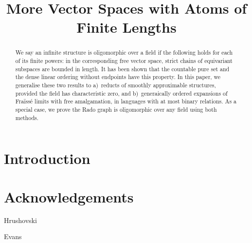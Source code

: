 \documentclass[conference]{IEEEtran}
\theoremstyle{definition}
\theoremstyle{remark}
\begin{document}
\title{More Vector Spaces with Atoms of Finite Lengths
}

\author{

\and

\and
}

\maketitle

\begin{abstract}
    We say an infinite structure is oligomorphic over a field 
    if the following holds for each of its finite powers:
    in the corresponding free vector space, strict chains of equivariant subspaces are bounded in length.
    It has been  shown that the countable pure set and the dense linear ordering without endpoints have this property.
    In this paper, we generalise these two results to
    a)~reducts of smoothly approximable structures, provided the field has characteristic zero, and
    b)~generaically ordered expansions of Fraïssé limits with free amalgamation, in languages with at most binary relations.
    As a special case, we prove the Rado graph is oligomorphic over any field using both methods.
\end{abstract}


\section{Introduction}




\section*{Acknowledgements}
Hrushovski

Evans

\printbibliography
\end{document}
